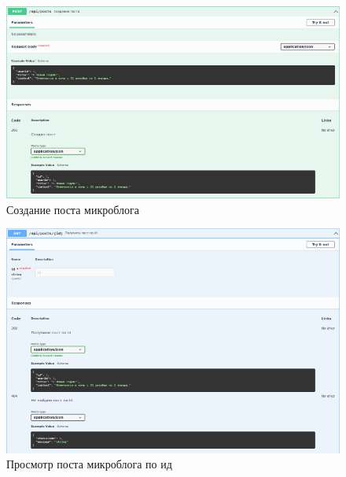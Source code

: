 \documentclass[12pt, a4paper, simple]{eskdtext}
\begin{document}
  \begin{figure}[p!h]
    \centering
    \includegraphics[width=14cm]
    {images/SwaggerUi/2023-02-25_18-08-35.png}
    \caption{Создание поста микроблога}
    \label{fig:more_3}
  \end{figure}

  \begin{figure}[p!h]
    \centering
    \includegraphics[width=14cm]
    {images/SwaggerUi/2023-02-25_18-09-03.png}
    \caption{Просмотр поста микроблога по ид}
    \label{fig:more_4}
  \end{figure}
\end{document}
